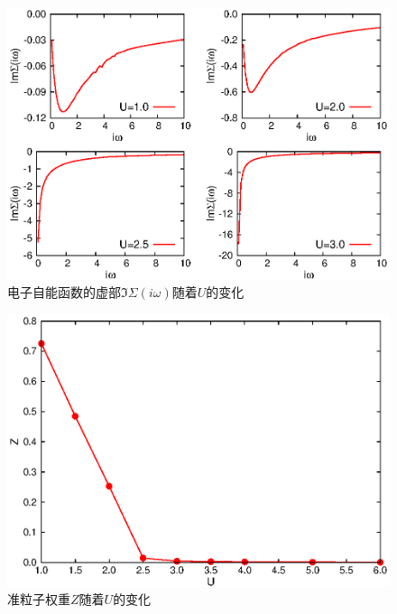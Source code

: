 \begin{figure}
\centering
\includegraphics{figure/sgm-mit.eps}
\caption{电子自能函数的虚部$\Im \Sigma (i\omega)$随着$U$的变化} 
\label{fig:sgmim-mit}
\end{figure}

\begin{figure}
\centering
\includegraphics{figure/quasi.eps}
\caption{准粒子权重$Z$随着$U$的变化} 
\label{fig:quasi-mit}
\end{figure}

